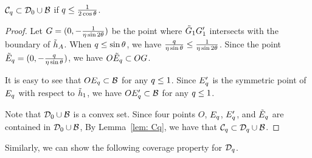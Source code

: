     

\begin{lemma}\label{lmm:Cq < Dq+Bq when q is small}
   $\mathcal{C}_{q}\subset \mathcal{D}_{0}\cup \mathcal{B}$ if $q\leq \frac{1}{2\cos{\theta}}$.
\end{lemma}

\begin{proof}%

Let $G = (0, -\frac{1}{\eta\sin{2\theta}})$ be the point where $\tilde {G}_{1} G_{1}'$ intersects with the boundary of $\tilde{h}_A$.
When  $q\leq \sin{\theta}$, we have $\frac{q}{\eta\sin{\theta}}\leq \frac{1}{\eta\sin{2\theta}}$.
Since the point $\tilde {E}_{q} = (0, - \frac{q}{\eta\sin{\theta}})$, we have $O\tilde {E}_{q}\subset OG$.

It is easy to see that $OE_{q}\subset \mathcal{B}$ for any $q\leq 1$. Since $E_{q}'$ is the symmetric point of $E_{q}$ with respect to $\tilde{h}_1$, we have $OE_{q}'\subset \mathcal{B}$ for any $q\leq 1$. 

Note that $\mathcal{D}_{0}\cup \mathcal{B}$ is a convex set. Since four points $O$, $E_{q}$, $E_{q}'$, and $\tilde {E}_{q}$ are contained in $\mathcal{D}_{0}\cup \mathcal{B}$, By Lemma~\ref{lem: Cq}, we have that $\mathcal{C}_{q}\subset \mathcal{D}_{q}\cup \mathcal{B}$.
\end{proof}

Similarly, we can show the following coverage property for $\mathcal{D}_{q}$.

